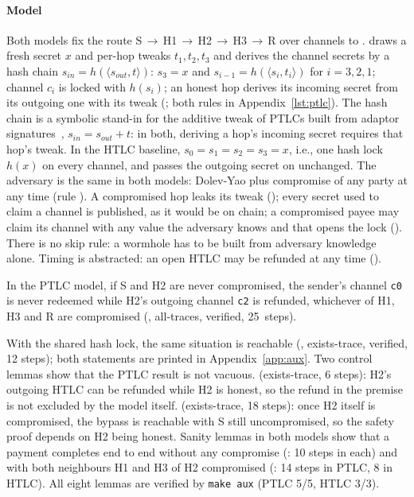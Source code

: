 \paragraph{Model}
Both models fix the route S$\,\to\,$H1$\,\to\,$H2$\,\to\,$H3$\,\to\,$R over channels
 to .  draws a fresh secret $x$ and per-hop tweaks
$t_1, t_2, t_3$ and derives the channel secrets by a hash chain
$s_{\mathit{in}} = h(\langle s_{\mathit{out}}, t\rangle)$: $s_3 = x$ and
$s_{i-1} = h(\langle s_i, t_i\rangle)$ for $i = 3, 2, 1$; channel $c_i$ is locked with
$h(s_i)$; an honest hop derives its incoming secret from its outgoing one with its tweak
(; both rules in Appendix~\ref{lst:ptlc}). The hash chain is a
symbolic stand-in for the additive tweak of PTLCs built from adaptor
signatures~\cite{malavolta2019}, $s_{\mathit{in}} = s_{\mathit{out}} + t$: in both, deriving a
hop's incoming secret requires that hop's tweak. In the HTLC baseline,
$s_0 = s_1 = s_2 = s_3 = x$, i.e., one hash lock $h(x)$ on every channel, and 
passes the outgoing secret on unchanged. The adversary is the same in both models: Dolev-Yao
plus compromise of any party at any time (rule ). A compromised hop leaks its
tweak (); every secret used to claim a channel is published, as it would be on
chain; a compromised payee may claim its channel with any value the adversary knows and that
opens the lock (). There is no skip rule: a wormhole has to be built from
adversary knowledge alone. Timing is abstracted: an open HTLC may be refunded at any time
().

\begin{lemma}
In the PTLC model, if S and H2 are never compromised, the sender's channel \texttt{c0} is
never redeemed while H2's outgoing channel \texttt{c2} is refunded, whichever of H1, H3 and R
are compromised ({\upshape{}}, all-traces, verified,
25~steps).
\end{lemma}
\noindent With the shared hash lock, the same situation is reachable
(, exists-trace, verified, 12 steps); both statements are
printed in Appendix~\ref{app:aux}. Two control lemmas show
that the PTLC result is not vacuous.  (exists-trace,
6 steps): H2's outgoing HTLC can be refunded while H2 is honest, so the refund in the premise is
not excluded by the model itself.  (exists-trace,
18 steps): once H2 itself is compromised, the bypass is reachable with S still uncompromised, so
the safety proof depends on H2 being honest. Sanity lemmas in both models show that a payment
completes end to end without any compromise (: 10 steps in each) and with both neighbours H1 and H3 of H2 compromised
(: 14 steps in PTLC, 8 in HTLC). All eight lemmas are
verified by \texttt{make aux} (PTLC 5/5, HTLC 3/3).

